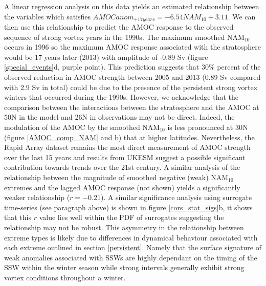 A linear regression analysis on this data yields an estimated relationship between the variables which satisfies $AMOC anom_{+17 years} = -6.54  NAM_{10} + 3.11$. We can then use this relationship to predict the AMOC response to the observed sequence of strong vortex years in the 1990s. The maximum  smoothed NAM$_{10}$ occurs in 1996 so the maximum AMOC response associated with the stratosphere would be 17 years later (2013) with amplitude of -0.89 Sv (figure \ref{special_events}d, purple point). This prediction suggests that 30\% percent of the observed reduction in AMOC strength  between 2005 and 2013 (0.89 Sv compared with 2.9 Sv in total) could be due to the presence of the persistent strong vortex winters that occurred during the 1990s. However, we acknowledge that the comparison between the interactions between the stratosphere and the AMOC at 50N in the model and 26N in observations may not be direct. Indeed, the modulation of the AMOC by the smoothed NAM$_{10}$ is less pronounced at 30N (figure \ref{AMOC_comp_NAM} and b) that at higher latitudes. Nevertheless, the Rapid Array dataset remains the most direct measurement of AMOC strength over the last 15 years and results from UKESM suggest a possible significant contribution towards trends over the 21st century.  A similar analysis of the relationship between the magnitude of smoothed negative (weak) NAM$_{10}$ extremes and the lagged AMOC response (not shown) yields a significantly weaker relationship ($r = -0.21$). A similar significance analysis using surrogate time-series (see paragraph above) is shown in figure \ref{cors_stat_sigs}b, it shows that this $r$ value lies well within the PDF of surrogates suggesting the relationship may not be robust. This asymmetry in the relationship between extreme types is likely due to differences in dynamical behaviour associated with each extreme outlined in section \ref{persistent}. Namely that the surface signature of weak anomalies associated with SSWs are highly dependant on the timing of the SSW within the winter season while strong intervals generally exhibit strong vortex conditions throughout a winter.  

